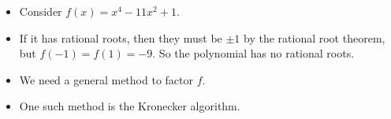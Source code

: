 \begin{frame}
\begin{itemize}
\item Consider $f(x)=x^{4}-11 x^{2}+1$. 
\item<2-> If it has rational roots, then they must be $\pm 1$ by the rational root theorem, but $f(-1)=f(1)=-9$. So the polynomial has no rational roots. 
\item<3-> We need a general method to factor $f$.
\item<4-> One such method is the Kronecker algorithm.
\end{itemize}

\end{frame}
